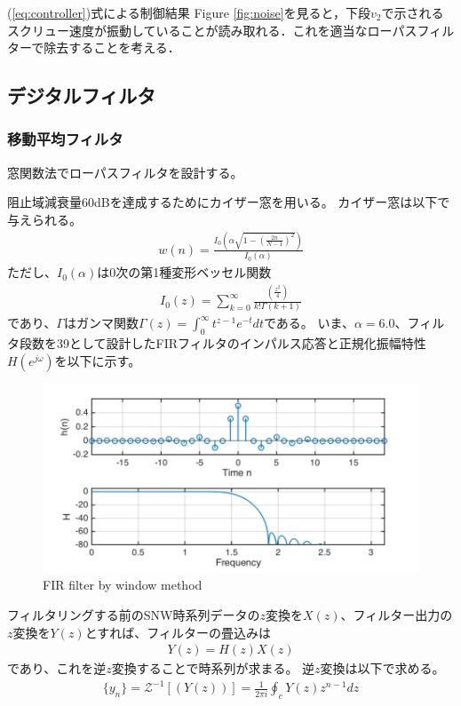\documentclass[twocolumn,oneside,a4paper]{article}
\begin{document}
(\ref{eq:controller})式による制御結果
Figure \ref{fig:noise}を見ると，下段$v_2$で示されるスクリュー速度が振動していることが読み取れる．これを適当なローパスフィルターで除去することを考える．


\subsection{デジタルフィルタ}
\subsubsection{移動平均フィルタ}
窓関数法でローパスフィルタを設計する。

阻止域減衰量60dBを達成するためにカイザー窓を用いる。
カイザー窓は以下で与えられる。
\begin{eqnarray*}
	w(n) = \frac{I_0 \left( \alpha \sqrt{1-\left(\frac{2n}{N-1}\right)^2} \right) }{I_0(\alpha)}	
\end{eqnarray*}
ただし、$I_0({\alpha})$は0次の第1種変形ベッセル関数
\begin{eqnarray*}
 I_0(z)	= \sum_{k=0}^{\infty}\frac{\left(\frac{z^2}{4}\right)}{k!\Gamma (k+1)}
\end{eqnarray*}
であり、$\Gamma$はガンマ関数$\Gamma(z) = \int_0^{\infty} t^{z-1}e^{-t} dt$である。
いま、$\alpha = 6.0$、フィルタ段数を39として設計したFIRフィルタのインパルス応答と正規化振幅特性$H(e^{j \omega})$を以下に示す。

\begin{figure}[htbp]
    \includegraphics[bb=0 0 432 216,width=1\columnwidth]{impulse_h.pdf}
    \caption{FIR filter by window method}
   \label{eq:fir_window}
\end{figure}

フィルタリングする前のSNW時系列データの$z$変換を$X(z)$、フィルター出力の$z$変換を$Y(z)$とすれば、フィルターの畳込みは
\begin{eqnarray*}
	Y(z) = H(z) X(z)
\end{eqnarray*}
であり、これを逆$z$変換することで時系列が求まる。
逆$z$変換は以下で求める。
\begin{eqnarray*}
	\{y_n\} = \mathcal{Z}^{-1}[(Y(z))] = \frac{1}{2 \pi i} \oint_c Y(z) z^{n-1} dz
\end{eqnarray*}
\end{document}

